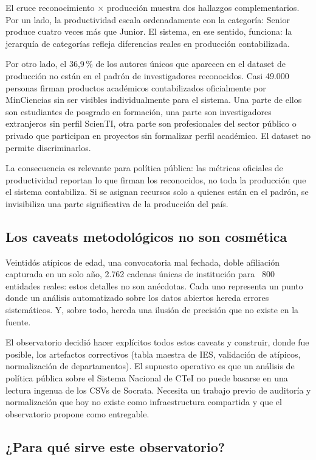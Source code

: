 \documentclass[11pt,a4paper,oneside]{article}
\begin{document}
El cruce reconocimiento × producción muestra dos hallazgos complementarios. Por un lado, la productividad escala ordenadamente con la categoría: Senior produce cuatro veces más que Junior. El sistema, en ese sentido, funciona: la jerarquía de categorías refleja diferencias reales en producción contabilizada.

Por otro lado, el 36{,}9\,\% de los autores únicos que aparecen en el dataset de producción no están en el padrón de investigadores reconocidos. Casi 49.000 personas firman productos académicos contabilizados oficialmente por MinCiencias sin ser visibles individualmente para el sistema. Una parte de ellos son estudiantes de posgrado en formación, una parte son investigadores extranjeros sin perfil ScienTI, otra parte son profesionales del sector público o privado que participan en proyectos sin formalizar perfil académico. El dataset no permite discriminarlos.

La consecuencia es relevante para política pública: las métricas oficiales de productividad reportan lo que firman los reconocidos, no toda la producción que el sistema contabiliza. Si se asignan recursos solo a quienes están en el padrón, se invisibiliza una parte significativa de la producción del país.

\subsection{Los caveats metodológicos no son cosmética}

Veintidós atípicos de edad, una convocatoria mal fechada, doble afiliación capturada en un solo año, 2.762 cadenas únicas de institución para ~800 entidades reales: estos detalles no son anécdotas. Cada uno representa un punto donde un análisis automatizado sobre los datos abiertos hereda errores sistemáticos. Y, sobre todo, hereda una ilusión de precisión que no existe en la fuente.

El observatorio decidió hacer explícitos todos estos caveats y construir, donde fue posible, los artefactos correctivos (tabla maestra de IES, validación de atípicos, normalización de departamentos). El supuesto operativo es que un análisis de política pública sobre el Sistema Nacional de CTeI no puede basarse en una lectura ingenua de los CSVs de Socrata. Necesita un trabajo previo de auditoría y normalización que hoy no existe como infraestructura compartida y que el observatorio propone como entregable.

\subsection{¿Para qué sirve este observatorio?}
\end{document}
